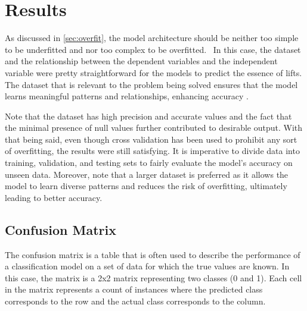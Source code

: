 %
\chapter{Results}
\label{sec:results}

As discussed in \ref{sec:overfit}, the model architecture should be neither too simple to be underfitted and nor too complex to be overfitted. 
In this case, the dataset and the relationship between the dependent variables and the independent variable were pretty straightforward for the models to predict the essence of lifts. 
The dataset that is relevant to the problem being solved ensures that the model learns meaningful patterns and relationships, enhancing accuracy
\cite{gudivada2017data}.

Note that the dataset has high precision and accurate values and the fact that the minimal presence of null values further contributed to desirable output. With that being said, even though cross validation has been used to prohibit any sort of overfitting, the results were still satisfying.
It is imperative to divide data into training, validation, and testing sets to fairly evaluate the model's accuracy on unseen data. Moreover, note that a larger dataset is preferred as it allows the model to learn diverse patterns and reduces the risk of overfitting, ultimately leading to better accuracy.





\section{Confusion Matrix}




The confusion matrix is a table that is often used to describe the performance of a classification model on a set of data for which the true values are known. In this case, the matrix is a 2x2 matrix representing two classes (0 and 1). Each cell in the matrix represents a count of instances where the predicted class corresponds to the row and the actual class corresponds to the column.


